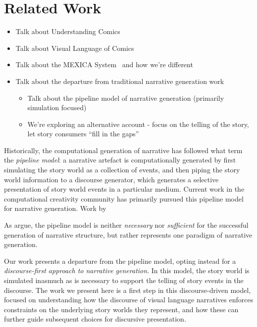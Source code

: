 \section{Related Work}





\begin{itemize}

	\item Talk about Understanding Comics~\cite{mcCloud1993understanding}
	\item Talk about Visual Language of Comics~\cite{cohn2013visual}
	\item Talk about the MEXICA System~\cite{perez2001mexica} and how we're different
	\item Talk about the departure from traditional narrative generation work
	\begin{itemize}
		\item Talk about the pipeline model of narrative generation (primarily 
		simulation focused)
		\item We're exploring an alternative account - 
		focus on the telling of the story, let story consumers ``fill in the gaps''
	\end{itemize}

\end{itemize}



Historically, the computational generation of narrative has followed what  term the \emph{pipeline model}: a narrative artefact is computationally generated by first simulating the story world as a collection of events, and then piping the story world information to a discourse generator, which generates a selective presentation of story world events in a particular medium. Current work in the computational creativity community has primarily pursued this pipeline model for narrative generation. Work by 

As \citeauthor{ronfard2014story} argue, the pipeline model is neither \emph{necessary} nor \emph{sufficient} for the successful generation of narrative structure, but rather represents one paradigm of narrative generation.  


Our work presents a departure from the pipeline model, opting instead for a \emph{discourse-first approach to narrative generation}. In this model, the story world is simulated inasmuch as is necessary to support the telling of story events in the discourse. The work we present here is a first step in this discourse-driven model, focused on understanding how the discourse of visual language narratives enforces constraints on the underlying story worlds they represent, and how these can further guide subsequent choices for discursive presentation.

